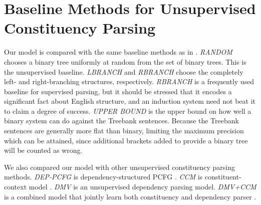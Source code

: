 \documentclass{article} \usepackage{iclr2018_conference,times}
\begin{document}
\section{Baseline Methods for Unsupervised Constituency Parsing} \label{appendix_parser_baseline}
Our model is compared with the same baseline methods as in \citep{klein2005natural}. \emph{RANDOM} chooses a binary tree uniformly at random from the set of binary trees. This is the unsupervised baseline. \emph{LBRANCH} and \emph{RBRANCH} choose the completely left- and right-branching structures, respectively. \emph{RBRANCH} is a frequently used baseline for supervised parsing, but it should be stressed that it encodes a significant fact about English structure, and an induction system need not beat it to claim a degree of success. \emph{UPPER BOUND} is the upper bound on how well a binary system can do against the Treebank sentences. Because the Treebank sentences are generally more flat than binary, limiting the maximum precision which can be attained, since additional brackets added to provide a binary tree will be counted as wrong.

We also compared our model with other unsupervised constituency parsing methods. \emph{DEP-PCFG} is dependency-structured PCFG \citep{carroll1992two}. \emph{CCM} is constituent-context model \citep{klein2002generative}. \emph{DMV} is an unsupervised dependency parsing model. \emph{DMV+CCM} is a combined model that jointly learn both constituency and dependency parser \citep{klein2004corpus}.



\appendix
\clearpage{}
\end{document}
